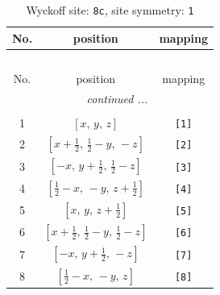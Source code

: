 \documentclass[fleqn,8pt]{jsarticle}
\begin{document}
\renewcommand{\arraystretch}{1.2}
\begin{longtable}{ccc}
\caption{Wyckoff site: {\tt 8c}, site symmetry: {\tt 1}}
 \\
 \hline \hline
No. & position & mapping \\ \hline \endfirsthead

\multicolumn{2}{l}{\tablename\ \thetable{}} \\
 \hline \hline
No. & position & mapping \\ \hline \endhead

 \hline \hline
\multicolumn{2}{r}{\footnotesize\it continued ...} \\ \endfoot

 \hline \hline
\multicolumn{2}{r}{} \\ \endlastfoot

1 & $\left[ x,\, y,\, z \right]$ & {\tt [1]} \\ \hline
2 & $\left[ x + \frac{1}{2},\, \frac{1}{2} - y,\, - z \right]$ & {\tt [2]} \\ \hline
3 & $\left[ - x,\, y + \frac{1}{2},\, \frac{1}{2} - z \right]$ & {\tt [3]} \\ \hline
4 & $\left[ \frac{1}{2} - x,\, - y,\, z + \frac{1}{2} \right]$ & {\tt [4]} \\ \hline
5 & $\left[ x,\, y,\, z + \frac{1}{2} \right]$ & {\tt [5]} \\ \hline
6 & $\left[ x + \frac{1}{2},\, \frac{1}{2} - y,\, \frac{1}{2} - z \right]$ & {\tt [6]} \\ \hline
7 & $\left[ - x,\, y + \frac{1}{2},\, - z \right]$ & {\tt [7]} \\ \hline
8 & $\left[ \frac{1}{2} - x,\, - y,\, z \right]$ & {\tt [8]} \\
\end{longtable}
\end{document}
